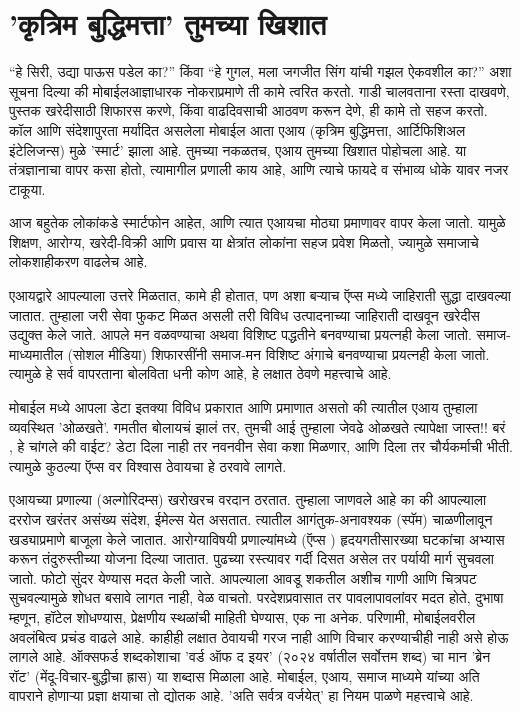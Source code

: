 \chapter{'कृत्रिम बुद्धिमत्ता' तुमच्या खिशात}

``हे सिरी, उद्या पाऊस पडेल का?'' किंवा ``हे गुगल, मला जगजीत सिंग यांची गझल ऐकवशील का?'' अशा सूचना दिल्या की मोबाईलआज्ञाधारक नोकराप्रमाणे ती कामे त्वरित करतो. गाडी चालवताना रस्ता दाखवणे, पुस्तक खरेदीसाठी शिफारस करणे, किंवा वाढदिवसाची आठवण करून देणे, ही कामे तो सहज करतो. कॉल आणि संदेशापुरता मर्यादित असलेला मोबाईल आता एआय (कृत्रिम बुद्धिमत्ता, आर्टिफिशिअल इंटेलिजन्स) मुळे 'स्मार्ट' झाला आहे. तुमच्या नकळतच, एआय तुमच्या खिशात पोहोचला आहे. या तंत्रज्ञानाचा वापर कसा होतो, त्यामागील प्रणाली काय आहे, आणि त्याचे फायदे व संभाव्य धोके यावर नजर टाकूया.

आज बहुतेक लोकांकडे स्मार्टफोन आहेत, आणि त्यात एआयचा मोठ्या प्रमाणावर वापर केला जातो. यामुळे शिक्षण, आरोग्य, खरेदी-विक्री आणि प्रवास या क्षेत्रांत लोकांना सहज प्रवेश मिळतो, ज्यामुळे समाजाचे लोकशाहीकरण वाढलेच आहे.

एआयद्वारे आपल्याला उत्तरे मिळतात, कामे ही होतात, पण अशा बऱ्याच ऍप्स मध्ये जाहिराती सुद्धा दाखवल्या जातात. तुम्हाला जरी सेवा फुकट मिळत असली तरी विविध उत्पादनाच्या जाहिराती दाखवून खरेदीस उद्युक्त केले जाते. आपले मन वळवण्याचा अथवा विशिष्ट पद्धतीने बनवण्याचा प्रयत्नही केला जातो. समाज-माध्यमातील (सोशल मीडिया) शिफारसींनी समाज-मन विशिष्ट अंगाचे बनवण्याचा प्रयत्नही केला जातो. त्यामुळे हे सर्व वापरताना बोलविता धनी कोण आहे, हे लक्षात ठेवणे महत्त्वाचे आहे.

मोबाईल मध्ये आपला डेटा इतक्या विविध प्रकारात आणि प्रमाणात असतो की त्यातील एआय तुम्हाला व्यवस्थित 'ओळखते'. गमतीत बोलायचं झालं तर, तुमची आई तुम्हाला जेवढे ओळखते त्यापेक्षा जास्त!! बरं , हे चांगले की वाईट? डेटा दिला नाही तर नवनवीन सेवा कशा मिळणार, आणि दिला तर चौर्यकर्माची भीती. त्यामुळे कुठल्या ऍप्स वर विश्वास ठेवायचा हे ठरवावे लागते.

एआयच्या प्रणाल्या (अल्गोरिदम्स) खरोखरच वरदान ठरतात. तुम्हाला जाणवले आहे का की आपल्याला दररोज खरंतर असंख्य संदेश, ईमेल्स येत असतात. त्यातील आगंतुक-अनावश्यक (स्पॅम) चाळणीलावून खड्याप्रमाणे बाजूला केले जातात. आरोग्याविषयी प्रणाल्यांमध्ये (ऍप्स ) हृदयगतीसारख्या घटकांचा अभ्यास करून तंदुरुस्तीच्या योजना दिल्या जातात. पुढच्या रस्त्यावर गर्दी दिसत असेल तर पर्यायी मार्ग सुचवला जातो. फोटो सुंदर येण्यास मदत केली जाते. आपल्याला आवडू शकतील अशीच गाणी आणि चित्रपट सुचवल्यामुळे शोधत बसावे लागत नाही, वेळ वाचतो. परदेशप्रवासात तर पावलापावलांवर मदत होते, दुभाषा म्हणून, हॉटेल शोधण्यास, प्रेक्षणीय स्थळांची माहिती घेण्यास, एक ना अनेक. परिणामी, मोबाईलवरील अवलंबित्व प्रचंड वाढले आहे. काहीही लक्षात ठेवायची गरज नाही आणि विचार करण्याचीही नाही असे होऊ लागले आहे. ऑक्सफर्ड शब्दकोशाचा 'वर्ड ऑफ द इयर' (२०२४ वर्षातील सर्वोत्तम शब्द) चा मान 'ब्रेन रॉट' (मेंदू-विचार-बुद्धीचा ह्रास) या शब्दास मिळाला आहे. मोबाईल, एआय, समाज माध्यमे यांच्या अति वापराने होणाऱ्या प्रज्ञा क्षयाचा तो द्योतक आहे. 'अति सर्वत्र वर्जयेत्' हा नियम पाळणे महत्त्वाचे आहे.

